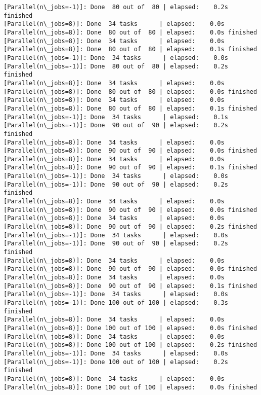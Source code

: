 \documentclass[11pt]{article}
\begin{document}
\begin{Verbatim}[commandchars=\\\{\}]
[Parallel(n\_jobs=-1)]: Done  80 out of  80 | elapsed:    0.2s finished
[Parallel(n\_jobs=8)]: Done  34 tasks      | elapsed:    0.0s
[Parallel(n\_jobs=8)]: Done  80 out of  80 | elapsed:    0.0s finished
[Parallel(n\_jobs=8)]: Done  34 tasks      | elapsed:    0.0s
[Parallel(n\_jobs=8)]: Done  80 out of  80 | elapsed:    0.1s finished
[Parallel(n\_jobs=-1)]: Done  34 tasks      | elapsed:    0.0s
[Parallel(n\_jobs=-1)]: Done  80 out of  80 | elapsed:    0.2s finished
[Parallel(n\_jobs=8)]: Done  34 tasks      | elapsed:    0.0s
[Parallel(n\_jobs=8)]: Done  80 out of  80 | elapsed:    0.0s finished
[Parallel(n\_jobs=8)]: Done  34 tasks      | elapsed:    0.0s
[Parallel(n\_jobs=8)]: Done  80 out of  80 | elapsed:    0.1s finished
[Parallel(n\_jobs=-1)]: Done  34 tasks      | elapsed:    0.1s
[Parallel(n\_jobs=-1)]: Done  90 out of  90 | elapsed:    0.2s finished
[Parallel(n\_jobs=8)]: Done  34 tasks      | elapsed:    0.0s
[Parallel(n\_jobs=8)]: Done  90 out of  90 | elapsed:    0.0s finished
[Parallel(n\_jobs=8)]: Done  34 tasks      | elapsed:    0.0s
[Parallel(n\_jobs=8)]: Done  90 out of  90 | elapsed:    0.1s finished
[Parallel(n\_jobs=-1)]: Done  34 tasks      | elapsed:    0.0s
[Parallel(n\_jobs=-1)]: Done  90 out of  90 | elapsed:    0.2s finished
[Parallel(n\_jobs=8)]: Done  34 tasks      | elapsed:    0.0s
[Parallel(n\_jobs=8)]: Done  90 out of  90 | elapsed:    0.0s finished
[Parallel(n\_jobs=8)]: Done  34 tasks      | elapsed:    0.0s
[Parallel(n\_jobs=8)]: Done  90 out of  90 | elapsed:    0.2s finished
[Parallel(n\_jobs=-1)]: Done  34 tasks      | elapsed:    0.0s
[Parallel(n\_jobs=-1)]: Done  90 out of  90 | elapsed:    0.2s finished
[Parallel(n\_jobs=8)]: Done  34 tasks      | elapsed:    0.0s
[Parallel(n\_jobs=8)]: Done  90 out of  90 | elapsed:    0.0s finished
[Parallel(n\_jobs=8)]: Done  34 tasks      | elapsed:    0.0s
[Parallel(n\_jobs=8)]: Done  90 out of  90 | elapsed:    0.1s finished
[Parallel(n\_jobs=-1)]: Done  34 tasks      | elapsed:    0.0s
[Parallel(n\_jobs=-1)]: Done 100 out of 100 | elapsed:    0.3s finished
[Parallel(n\_jobs=8)]: Done  34 tasks      | elapsed:    0.0s
[Parallel(n\_jobs=8)]: Done 100 out of 100 | elapsed:    0.0s finished
[Parallel(n\_jobs=8)]: Done  34 tasks      | elapsed:    0.0s
[Parallel(n\_jobs=8)]: Done 100 out of 100 | elapsed:    0.2s finished
[Parallel(n\_jobs=-1)]: Done  34 tasks      | elapsed:    0.0s
[Parallel(n\_jobs=-1)]: Done 100 out of 100 | elapsed:    0.2s finished
[Parallel(n\_jobs=8)]: Done  34 tasks      | elapsed:    0.0s
[Parallel(n\_jobs=8)]: Done 100 out of 100 | elapsed:    0.0s finished

\end{Verbatim}
\end{document}
